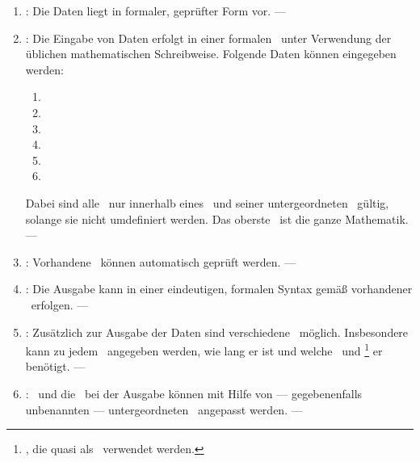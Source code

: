 %
\begin{enumerate}

	\item \label{Anforderung:Form} :
	Die Daten liegt in formaler, geprüfter Form vor.
	--- 

	\item \label{Anforderung:Eingaben} :
	Die Eingabe von Daten erfolgt in einer formalen \Syntax\ unter Verwendung der üblichen mathematischen Schreibweise.
	Folgende Daten können eingegeben werden:
	\begin{enumerate}
		\item \Axiome
		\item \Saetze
		\item \Beweise
		\item \Fachbegriffe
		\item \Fachgebiete
		\item \Ausgabeschemata
	\end{enumerate}
	Dabei sind alle \Begriffe\ nur innerhalb eines \Fachgebiets\ und seiner untergeordneten \Fachgebiete\ gültig, solange sie nicht umdefiniert werden.
	Das oberste \Fachgebiet\ ist die ganze Mathematik.
	--- 

	\item \label{Anforderung:Pruefung} :
	Vorhandene \Beweise\ können automatisch geprüft werden.
	--- 

	\item \label{Anforderung:Ausgaben} :
	Die Ausgabe kann in einer eindeutigen, formalen Syntax gemäß vorhandener \Ausgabeschemata\ erfolgen.
	--- 

	\item \label{Anforderung:Auswertungen} :
	Zusätzlich zur Ausgabe der Daten sind verschiedene \Auswertungen\ möglich.
	Insbesondere kann zu jedem \Beweis\ angegeben werden, wie lang er ist und welche \Axiome\ und \Saetze%
	\footnote{\Saetze, die quasi als \Axiome\ verwendet werden.}
	er benötigt.
	--- 

	\item \label{Anforderung:Anpassbarkeit} :
	\Fachbegriffe\ und die \Darstellung\ bei der Ausgabe können mit Hilfe von --- gegebenenfalls unbenannten --- untergeordneten \Fachgebieten\ angepasst werden.
	--- 


\end{enumerate}
